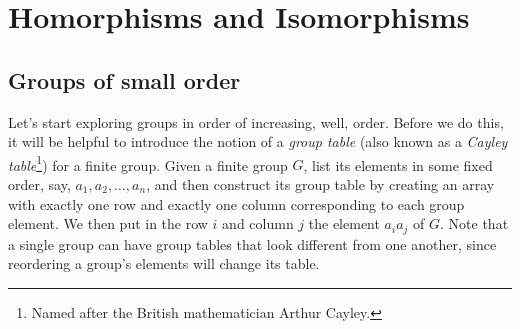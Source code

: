 \documentclass[10pt,]{book}
\theoremstyle{plain}
\theoremstyle{definition}
\theoremstyle{definition}
\theoremstyle{definition}
\theoremstyle{definition}
\numberwithin{equation}{section}
\begin{document}
\chapter[{Homorphisms and Isomorphisms}]{Homorphisms and Isomorphisms}\label{homoiso}
\typeout{************************************************}
\typeout{************************************************}
\section[{Groups of small order}]{Groups of small order}\label{section-10}

    Let's start exploring groups in order of increasing, well, order. Before we do this, it will be helpful to introduce the notion of a \emph{group table} (also known as a \emph{Cayley table}\footnote{Named after the British mathematician Arthur Cayley.\label{fn-1}}) for a finite group. Given a finite group \(G\), list its elements in some fixed order, say, \(a_1, a_2, \ldots, a_n\), and then construct its group table by creating an array with exactly one row and exactly one column corresponding to each group element. We then put in the row \(i\) and column \(j\) the element \(a_ia_j\) of \(G\). Note that a single group can have group tables that look different from one another, since reordering a group's elements will change its table.
\end{document}
